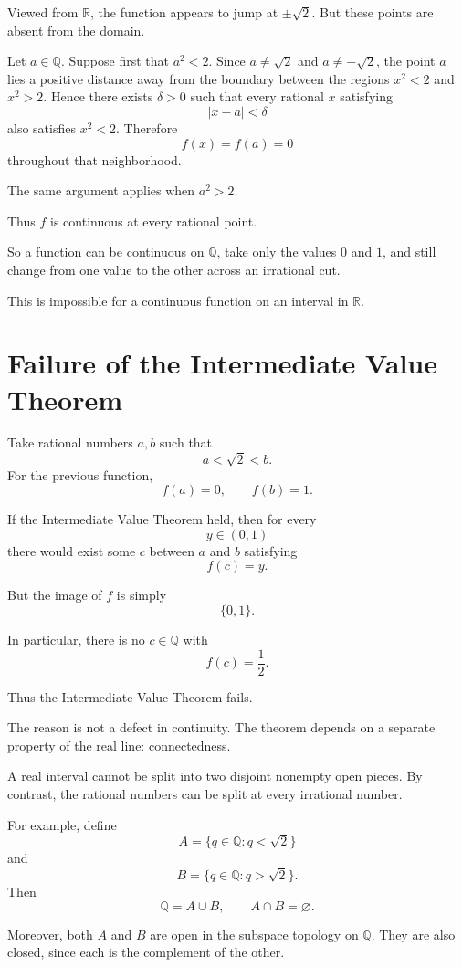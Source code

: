\documentclass{essay}
\begin{document}
Viewed from \(\mathbb{R}\), the function appears to jump at
\(\pm\sqrt{2}\). But these points are absent from the domain.

Let \(a\in\mathbb{Q}\). Suppose first that \(a^2<2\). Since
\(a\neq \sqrt{2}\) and \(a\neq-\sqrt{2}\), the point \(a\) lies a positive
distance away from the boundary between the regions \(x^2<2\) and \(x^2>2\).
Hence there exists \(\delta>0\) such that every rational \(x\) satisfying
\[
|x-a|<\delta
\]
also satisfies \(x^2<2\). Therefore
\[
f(x)=f(a)=0
\]
throughout that neighborhood.

The same argument applies when \(a^2>2\).

Thus \(f\) is continuous at every rational point.

So a function can be continuous on \(\mathbb{Q}\), take only the values
\(0\) and \(1\), and still change from one value to the other across an
irrational cut.

This is impossible for a continuous function on an interval in
\(\mathbb{R}\).

\section{Failure of the Intermediate Value Theorem}

Take rational numbers \(a,b\) such that
\[
a<\sqrt{2}<b.
\]
For the previous function,
\[
f(a)=0,
\qquad
f(b)=1.
\]

If the Intermediate Value Theorem held, then for every
\[
y\in(0,1)
\]
there would exist some \(c\) between \(a\) and \(b\) satisfying
\[
f(c)=y.
\]

But the image of \(f\) is simply
\[
\{0,1\}.
\]

In particular, there is no \(c\in\mathbb{Q}\) with
\[
f(c)=\frac12.
\]

Thus the Intermediate Value Theorem fails.

The reason is not a defect in continuity. The theorem depends on a separate
property of the real line: connectedness.

A real interval cannot be split into two disjoint nonempty open pieces. By
contrast, the rational numbers can be split at every irrational number.

For example, define
\[
A=\{q\in\mathbb{Q}:q<\sqrt{2}\}
\]
and
\[
B=\{q\in\mathbb{Q}:q>\sqrt{2}\}.
\]
Then
\[
\mathbb{Q}=A\cup B,
\qquad
A\cap B=\varnothing.
\]

Moreover, both \(A\) and \(B\) are open in the subspace topology on
\(\mathbb{Q}\). They are also closed, since each is the complement of the
other.
\end{document}
